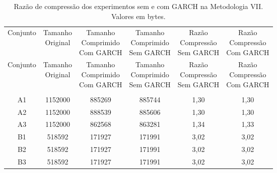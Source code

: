\begin{center}
\begin{longtable}{cccccc}
\toprule
\rowcolor{white}
\caption[Metodologia VII: Razão de compressão]{Razão de compressão dos
experimentos sem e com GARCH na Metodologia VII.
Valores em bytes.} \label{Tab:razaocompressaoMet7} \\
\midrule
Conjunto & \specialcell{Tamanho \\Original} & \specialcell{Tamanho
\\Comprimido\\Com GARCH} & \specialcell{Tamanho
\\Comprimido\\Sem GARCH} & \specialcell{Razão \\Compressão
\\Sem GARCH} & \specialcell{Razão \\Compressão
\\Com GARCH} \\
\midrule
\endfirsthead
\midrule
\rowcolor{white}
Conjunto & \specialcell{Tamanho \\Original} & \specialcell{Tamanho
\\Comprimido\\Com GARCH} & \specialcell{Tamanho
\\Comprimido\\Sem GARCH} & \specialcell{Razão \\Compressão
\\Sem GARCH} & \specialcell{Razão \\Compressão
\\Com GARCH} \\
\toprule
\endhead
\midrule \\ %
\endfoot
\bottomrule
\endlastfoot
    A1    & 1152000 & 885269 & 885744 & 1,30  & 1,30 \\
    A2    & 1152000 & 888539 & 885606 & 1,30  & 1,30 \\
    A3    & 1152000 & 862568 & 863281 & 1,34  & 1,33 \\
    B1    & 518592 & 171927 & 171991 & 3,02  & 3,02 \\
    B2    & 518592 & 171927 & 171991 & 3,02  & 3,02 \\
    B3    & 518592 & 171927 & 171991 & 3,02  & 3,02 \\

\end{longtable}
\end{center}
